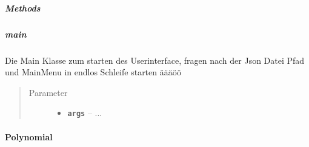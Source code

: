 \documentclass[letterpaper,10pt,ngerman]{sphinxmanual}
\begin{document}
\subparagraph{Methods}
\label{com/linuxluigi/polynomial/Main:methods}

\subparagraph{main}
\label{com/linuxluigi/polynomial/Main:id1}

\begin{fulllineitems}
\label{com/linuxluigi/polynomial/Main:com.linuxluigi.polynomial.Main.main(String__)}
Die Main Klasse zum starten des Userinterface, fragen nach der Json Datei Pfad und MainMenu in endlos Schleife starten äääöö
\begin{quote}\begin{description}
\item[{Parameter}] \leavevmode\begin{itemize}
\item {} 
\textbf{\texttt{args}} -- 
...


\end{itemize}

\end{description}\end{quote}

\end{fulllineitems}



\paragraph{Polynomial}
\label{com/linuxluigi/polynomial/Polynomial:polynomial}\label{com/linuxluigi/polynomial/Polynomial::doc}
\end{document}
